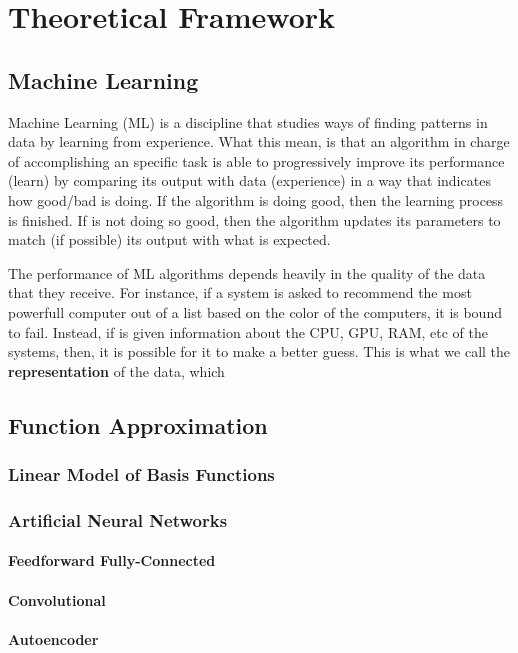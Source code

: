 \chapter{Theoretical Framework}

\section{Machine Learning}
Machine Learning (ML) is a discipline that studies ways of finding patterns in data by learning from experience. What this mean, is that an algorithm in charge of accomplishing an specific task is able to progressively improve its performance (learn) by comparing its output with data (experience) in a way that indicates how good/bad is doing. If the algorithm is doing good, then the learning process is finished. If is not doing so good, then the algorithm updates its parameters to match (if possible) its output with what is expected.  

The performance of ML algorithms depends heavily in the quality of the data that they receive. For instance, if a system is asked to recommend the most powerfull computer out of a list based on the color of the computers, it is bound to fail. Instead, if is given information about the CPU, GPU, RAM, etc of the systems, then, it is possible for it to make a better guess. This is what we call the \textbf{representation} of the data, which 

\section{Function Approximation}
\subsection{Linear Model of Basis Functions}
\subsection{Artificial Neural Networks}
\subsubsection{Feedforward Fully-Connected}
\subsubsection{Convolutional}
\subsubsection{Autoencoder}
